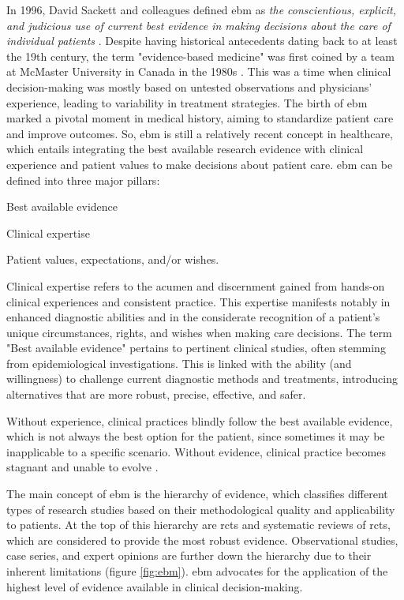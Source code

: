 
In 1996, David Sackett and colleagues defined \ac{ebm} as \textit{the conscientious, explicit, and judicious use of current best evidence in making decisions about the care of individual patients} \cite{sackettEvidenceBasedMedicine1996}. Despite having historical antecedents dating back to at least the 19th century, the term "evidence-based medicine" was first coined by a team at McMaster University in Canada in the 1980s \cite{thomaBriefHistoryEvidenceBased2015}. This was a time when clinical decision-making was mostly based on untested observations and physicians' experience, leading to variability in treatment strategies. The birth of \ac{ebm} marked a pivotal moment in medical history, aiming to standardize patient care and improve outcomes. So, \ac{ebm} is still a relatively recent concept in healthcare, which entails integrating the best available research evidence with clinical experience and patient values to make decisions about patient care. \Ac{ebm} can be defined into three major pillars:

\begin{myitemize}
    \item Best available evidence
    \item Clinical expertise
    \item Patient values, expectations, and/or wishes.
\end{myitemize}

Clinical expertise refers to the acumen and discernment gained from hands-on clinical experiences and consistent practice. This expertise manifests notably in enhanced diagnostic abilities and in the considerate recognition of a patient's unique circumstances, rights, and wishes when making care decisions. The term "Best available evidence" pertains to pertinent clinical studies, often stemming from epidemiological investigations. This is linked with the ability (and willingness) to challenge current diagnostic methods and treatments, introducing alternatives that are more robust, precise, effective, and safer. 

Without experience, clinical practices blindly follow the best available evidence, which is not always the best option for the patient, since sometimes it may be inapplicable to a specific scenario. Without evidence, clinical practice becomes stagnant and unable to evolve \cite{sackettEvidenceBasedMedicine1996}.

The main concept of \ac{ebm} is the hierarchy of evidence, which classifies different types of research studies based on their methodological quality and applicability to patients. At the top of this hierarchy are \acp{rct} and systematic reviews of \acp{rct}, which are considered to provide the most robust evidence. Observational studies, case series, and expert opinions are further down the hierarchy due to their inherent limitations (figure \ref{fig:ebm}). \ac{ebm} advocates for the application of the highest level of evidence available in clinical decision-making.

